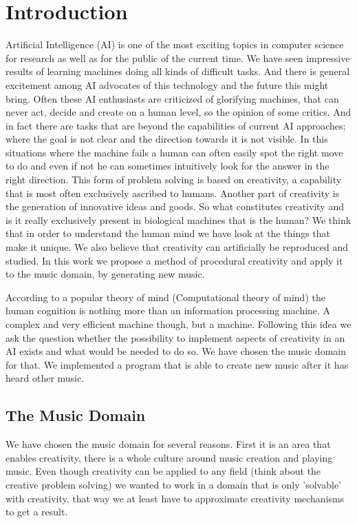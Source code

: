 \section{Introduction} 
Artificial Intelligence (AI) is one of the most exciting topics in computer science for research as well as for the public of the current time. We have seen impressive results of learning machines doing all kinds of difficult tasks. And there is general excitement among AI advocates of this technology and the future this might bring. Often these AI enthusiasts are criticized of glorifying machines, that can never act, decide and create on a human level, so the opinion of some critics. And in fact there are tasks that are beyond the capabilities of current AI approaches; where the goal is not clear and the direction towards it is not visible. In this situations where the machine fails a human can often easily spot the right move to do and even if not he can sometimes intuitively look for the answer in the right direction. This form of problem solving is based on creativity, a capability that is most often exclusively ascribed to humans. Another part of creativity is the generation of innovative ideas and goods. So what constitutes creativity and is it really exclusively present in biological machines that is the human? We think that in order to understand the human mind we have look at the things that make it unique. We also believe that creativity can artificially be reproduced and studied. In this work we propose a method of procedural creativity and apply it to the music domain, by generating new music.

According to a popular theory of mind (Computational theory of mind) the human cognition is nothing more than an information processing machine. A complex and very efficient machine though, but a machine. Following this idea we ask the question whether the possibility to implement aspects of creativity in an AI exists and what would be needed to do so. We have chosen the music domain for that. We implemented a program that is able to create new music after it has heard other music.

\subsection{The Music Domain}
We have chosen the music domain for several reasons. First it is an area that enables creativity, there is a whole culture around music creation and playing music. Even though creativity can be applied to any field (think about the creative problem solving) we wanted to work in a domain that is only 'solvable' with creativity, that way we at least have to approximate creativity mechanisms to get a result.

